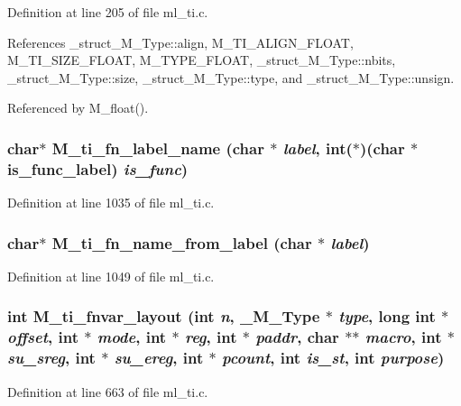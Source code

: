 Definition at line 205 of file ml\_\-ti.c.

References \_\-struct\_\-M\_\-Type::align, M\_\-TI\_\-ALIGN\_\-FLOAT, M\_\-TI\_\-SIZE\_\-FLOAT, M\_\-TYPE\_\-FLOAT, \_\-struct\_\-M\_\-Type::nbits, \_\-struct\_\-M\_\-Type::size, \_\-struct\_\-M\_\-Type::type, and \_\-struct\_\-M\_\-Type::unsign.

Referenced by M\_\-float().
\subsubsection{\setlength{\rightskip}{0pt plus 5cm}char$\ast$ M\_\-ti\_\-fn\_\-label\_\-name (char $\ast$ {\em label}, int($\ast$)(char $\ast$is\_\-func\_\-label) {\em is\_\-func})}\label{m__ti_8h_9b25ba9608d5105b695d8edcb3f5be61}




Definition at line 1035 of file ml\_\-ti.c.
\subsubsection{\setlength{\rightskip}{0pt plus 5cm}char$\ast$ M\_\-ti\_\-fn\_\-name\_\-from\_\-label (char $\ast$ {\em label})}\label{m__ti_8h_aeaa8b8fde571ac42208d73f0ccd6bb5}




Definition at line 1049 of file ml\_\-ti.c.
\subsubsection{\setlength{\rightskip}{0pt plus 5cm}int M\_\-ti\_\-fnvar\_\-layout (int {\em n}, \bf{\_\-M\_\-Type} $\ast$ {\em type}, long int $\ast$ {\em offset}, int $\ast$ {\em mode}, int $\ast$ {\em reg}, int $\ast$ {\em paddr}, char $\ast$$\ast$ {\em macro}, int $\ast$ {\em su\_\-sreg}, int $\ast$ {\em su\_\-ereg}, int $\ast$ {\em pcount}, int {\em is\_\-st}, int {\em purpose})}\label{m__ti_8h_2e3c9aee819e829a2bee9c7a18c82e5f}




Definition at line 663 of file ml\_\-ti.c.

